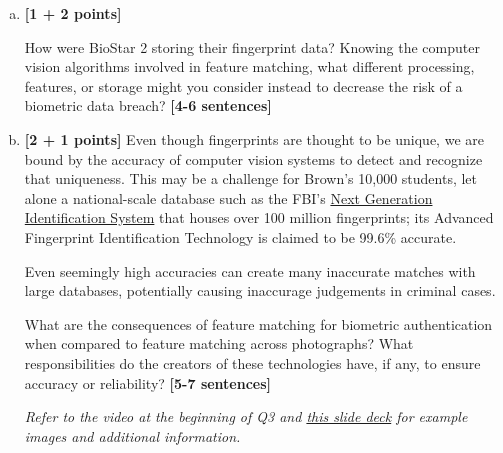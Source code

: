 \documentclass[11pt]{article}
\begin{document}
\begin{enumerate}[(a)]
    \item \textbf{[1 + 2 points]}
    \begin{tcolorbox}[colback=orange!5!white,colframe=orange!75!black]
    How were BioStar 2 storing their fingerprint data? Knowing the computer vision algorithms involved in feature matching, what different processing, features, or storage might you consider instead to decrease the risk of a biometric data breach? \textbf{[4-6 sentences]}
    \end{tcolorbox}


    \pagebreak
    \item 
    \textbf{[2 + 1 points]}
Even though fingerprints are thought to be unique, we are bound by the accuracy of computer vision systems to detect and recognize that uniqueness.
This may be a challenge for Brown's 10,000 students, let alone a national-scale database such as the FBI's \href{https://www.fbi.gov/services/cjis/fingerprints-and-other-biometrics/ngi}{Next Generation Identification System} that houses over 100 million fingerprints; its Advanced Fingerprint Identification Technology is claimed to be 99.6\% accurate.

Even seemingly high accuracies can create many inaccurate matches with large databases, potentially causing inaccurage judgements in criminal cases. 

    \begin{tcolorbox}[colback=orange!5!white,colframe=orange!75!black]
    What are the consequences of feature matching for biometric authentication when compared to feature matching across photographs? What responsibilities do the creators of these technologies have, if any, to ensure accuracy or reliability? \textbf{[5-7 sentences]}

    \emph{Refer to the video at the beginning of Q3 and \href{http://biometrics.cse.msu.edu/Presentations/AnilJain_UniquenessOfFingerprints_NAS05.pdf}{this slide deck} for example images and additional information.}
    \end{tcolorbox}


\end{enumerate}
\end{document}
